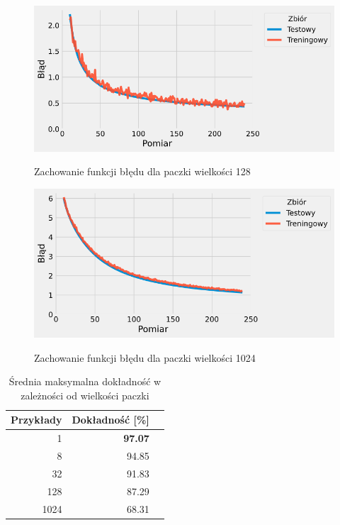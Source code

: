 \documentclass{article}
\begin{document}
\begin{figure}[H]
	\centering
	\caption{Zachowanie funkcji błędu dla paczki wielkości 128}
	\includegraphics[width=\textwidth]{batch_err_128.png}
	\label{fig:res26}
\end{figure}
\begin{figure}[H]
	\centering
	\caption{Zachowanie funkcji błędu dla paczki wielkości 1024}
	\includegraphics[width=\textwidth]{batch_err_1024.png}
	\label{fig:res27}
\end{figure}

\begin{table}[H]
	\caption{Średnia maksymalna dokładność w zależności od wielkości paczki}
	\label{tabela-res-21}
	\centering
	\begin{tabular}{rrr}
		\toprule
		Przykłady & Dokładność [\%] \\
		\midrule
		1          & \textbf{97.07}     \\
		8          & 94.85              \\
		32         & 91.83              \\
		128        & 87.29              \\
		1024       & 68.31              \\
		\bottomrule
	\end{tabular}
\end{table}
\end{document}
